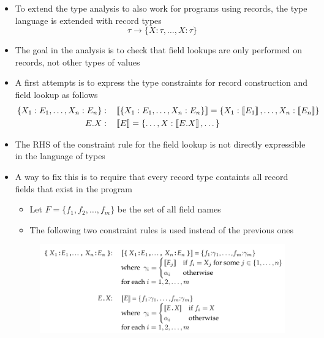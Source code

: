 \begin{itemize}
  \item To extend the type analysis to also work for programs using records, the type language is extended with record types
  \begin{equation*}
    \tau \rightarrow\{X: \tau, \ldots, X: \tau\}
  \end{equation*}
  \item The goal in the analysis is to check that field lookups are only performed on records, not other types of values
	\item A first attempts is to express the type constraints for record construction and field lookup as follows
  \begin{equation*}
    \begin{aligned}
      \left\{X_{1}: E_{1}, \ldots, X_{n}: E_{n}\right\}: & \quad \left\llbracket\{X_{1}: E_{1}, \ldots, X_{n}: E_{n}\}\right\rrbracket= \{X_1: \left\llbracket E_1\right\rrbracket, \dots, X_n : \left\llbracket E_n\right\rrbracket\} \\
      E.X: & \quad \left\llbracket E\right\rrbracket = \{\dots, X: \left\llbracket E.X\right\rrbracket, \dots \}
    \end{aligned}
  \end{equation*}
  \item The RHS of the constraint rule for the field lookup is not directly expressible in the language of types
	\item A way to fix this is to require that every record type containts all record fields that exist in the program
  \begin{itemize}
	  \item Let $F = \{f_1,f_2, \dots, f_m\}$ be the set of all field names
	  \item The following two constraint rules is used instead of the previous ones
  \end{itemize}
  \begin{figure}[H]
  	\centering
  	\includegraphics[width=400pt]{img/record_ty}
  \end{figure}
\end{itemize}

\newpage

